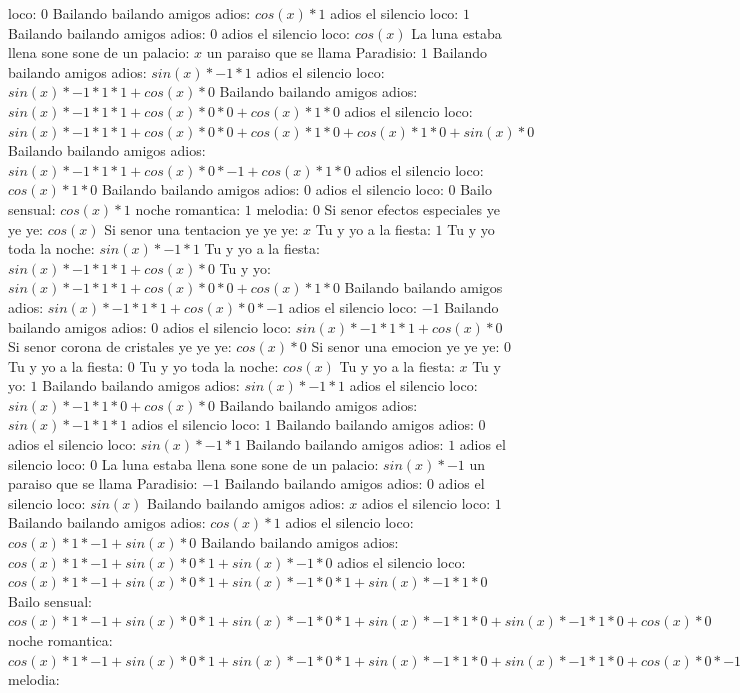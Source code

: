 \documentclass{article}
\begin{document}
loco: $0$  \newline Bailando bailando amigos adios: $cos(x)*1$ adios el silencio loco: $1$ Bailando bailando amigos adios: $0$  \newline adios el silencio loco: $cos(x)$  \newline La luna estaba llena sone sone de un palacio: $x$ un paraiso que se llama Paradisio: $1$  \newline Bailando bailando amigos adios: $sin(x)*-1*1$ adios el silencio loco: $sin(x)*-1*1*1+cos(x)*0$ Bailando bailando amigos adios: ${sin(x)*-1*1*1+cos(x)*0}*0+cos(x)*1*0$ adios el silencio loco: ${sin(x)*-1*1*1+cos(x)*0}*0+cos(x)*1*0+cos(x)*1*0+sin(x)*0$ Bailando bailando amigos adios: ${sin(x)*-1*1*1+cos(x)*0}*-1+cos(x)*1*0$  \newline adios el silencio loco: $cos(x)*1*0$ Bailando bailando amigos adios: $0$ adios el silencio loco: $0$  \newline Bailo sensual: $cos(x)*1$ noche romantica: $1$ melodia: $0$  \newline Si senor efectos especiales ye ye ye: $cos(x)$  \newline Si senor una tentacion ye ye ye: $x$ Tu y yo a la fiesta: $1$  \newline Tu y yo toda la noche: $sin(x)*-1*1$ Tu y yo a la fiesta: $sin(x)*-1*1*1+cos(x)*0$ Tu y yo: ${sin(x)*-1*1*1+cos(x)*0}*0+cos(x)*1*0$ Bailando bailando amigos adios: ${sin(x)*-1*1*1+cos(x)*0}*-1$ adios el silencio loco: $-1$ Bailando bailando amigos adios: $0$  \newline adios el silencio loco: $sin(x)*-1*1*1+cos(x)*0$  \newline Si senor corona de cristales ye ye ye: $cos(x)*0$ Si senor una emocion ye ye ye: $0$ Tu y yo a la fiesta: $0$  \newline Tu y yo toda la noche: $cos(x)$  \newline Tu y yo a la fiesta: $x$ Tu y yo: $1$  \newline Bailando bailando amigos adios: $sin(x)*-1*1$ adios el silencio loco: $sin(x)*-1*1*0+cos(x)*0$ Bailando bailando amigos adios: $sin(x)*-1*1*1$ adios el silencio loco: $1$ Bailando bailando amigos adios: $0$  \newline adios el silencio loco: $sin(x)*-1*1$ Bailando bailando amigos adios: $1$ adios el silencio loco: $0$  \newline La luna estaba llena sone sone de un palacio: $sin(x)*-1$ un paraiso que se llama Paradisio: $-1$ Bailando bailando amigos adios: $0$  \newline adios el silencio loco: $sin(x)$  \newline Bailando bailando amigos adios: $x$ adios el silencio loco: $1$  \newline Bailando bailando amigos adios: $cos(x)*1$ adios el silencio loco: $cos(x)*1*-1+sin(x)*0$ Bailando bailando amigos adios: ${cos(x)*1*-1+sin(x)*0}*1+sin(x)*-1*0$ adios el silencio loco: ${{cos(x)*1*-1+sin(x)*0}*1+sin(x)*-1*0}*1+sin(x)*-1*1*0$ Bailo sensual: ${{cos(x)*1*-1+sin(x)*0}*1+sin(x)*-1*0}*1+sin(x)*-1*1*0+sin(x)*-1*1*0+cos(x)*0$ noche romantica: ${{{cos(x)*1*-1+sin(x)*0}*1+sin(x)*-1*0}*1+sin(x)*-1*1*0+sin(x)*-1*1*0+cos(x)*0}*-1+{sin(x)*-1*1*1+cos(x)*0}*0$ melodia: 
\end{document}
